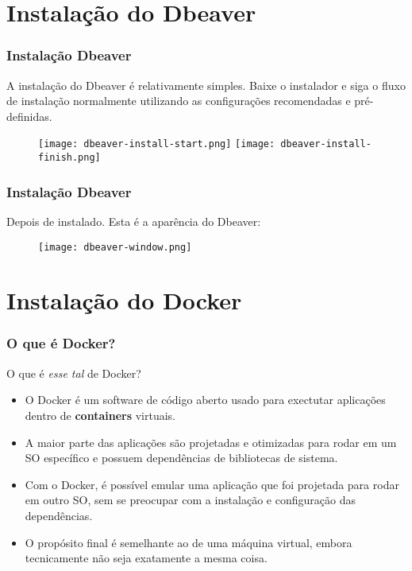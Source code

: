 \documentclass[t, 10pt, aspectratio=169, table, x11names]{beamer}
\begin{document}
	\section{Instalação do Dbeaver}

	\begin{frame}
		\frametitle{Instalação Dbeaver}
		A instalação do Dbeaver é relativamente simples. Baixe o instalador e siga o fluxo de instalação normalmente utilizando as configurações recomendadas e pré-definidas.
		\begin{figure}[h]
			\centering\vspace{2mm}
			\texttt{[image: dbeaver-install-start.png]}
			\hspace{0.5cm}
			\texttt{[image: dbeaver-install-finish.png]}
		\end{figure}
	\end{frame}
	
	\begin{frame}
		\frametitle{Instalação Dbeaver}
		Depois de instalado. Esta é a aparência do Dbeaver:
		\begin{figure}[h]
			\centering\vspace{2mm}
			\texttt{[image: dbeaver-window.png]}
		\end{figure}
	\end{frame}

	\section{Instalação do Docker}

	\begin{frame}
		\frametitle{O que é Docker?}
		O que é \textit{esse tal} de Docker?
		\vspace{3mm} 
		\begin{itemize}
			\item O Docker é um software de código aberto usado para exectutar aplicações dentro de \textbf{containers} virtuais.
			\vspace{2mm}
			\item A maior parte das aplicações são projetadas e otimizadas para rodar em um SO específico e possuem dependências de bibliotecas de sistema.
			\vspace{2mm}
			\item Com o Docker, é possível emular uma aplicação que foi projetada para rodar em outro SO, sem se preocupar com a instalação e configuração das dependências.
			\vspace{2mm}
			\item O propósito final é semelhante ao de uma máquina virtual, embora tecnicamente não seja exatamente a mesma coisa.
		\end{itemize}
	\end{frame}
\end{document}
